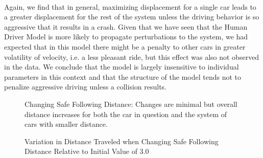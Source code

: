 \documentclass[12pt]{article}
\begin{document}
\paragraph{}Again, we find that in general, maximizing displacement for a single car leads to a greater displacement for the rest of the system unless the driving behavior is so aggressive that it results in a crash. Given that we have seen that the Human Driver Model is more likely to propagate perturbations to the system, we had expected that in this model there might be a penalty to other cars in greater volatility of velocity, i.e. a less pleasant ride, but this effect was also not observed in the data. We conclude that the model is largely insensitive to individual parameters in this context and that the structure of the model tends not to penalize aggressive driving unless a collision results.\\
\begin{figure}[H]
  \centering
  \caption{Changing Safe Following Distance: Changes are minimal but overall distance increases for both the car in question and the system of cars with smaller distance.}
\end{figure}

\begin{figure}[H]
  \centering
  \caption{Variation in Distance Traveled when Changing Safe Following Distance Relative to Initial Value of 3.0}
\end{figure}
\end{document}
